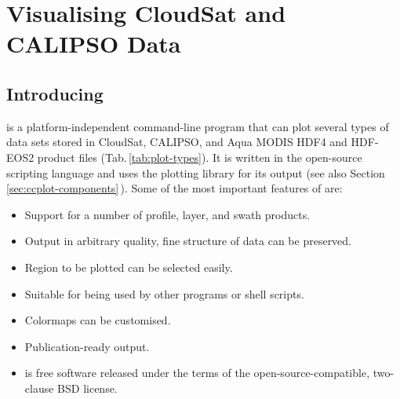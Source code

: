 \chapter{Visualising CloudSat and CALIPSO Data}\label{chap:ccplot}

\section{Introducing \ccplot}
\ccplot is a platform-independent command-line program that can plot several
types of data sets stored in CloudSat, CALIPSO, and Aqua MODIS HDF4 and HDF-EOS2
product files (Tab.\,\ref{tab:plot-types}). It is written in the open-source
scripting language
 and uses the
 plotting library for its output (see also
Section\,\ref{sec:ccplot-components}\,). Some of the most
important features of \ccplot are:

\begin{itemize}
\setlength{\itemsep}{0pt}
\setlength{\parskip}{0pt}
\setlength{\parsep}{0pt}
\item Support for a number of profile, layer, and swath products.
\item Output in arbitrary quality, fine structure of data can be preserved.
\item Region to be plotted can be selected easily.
\item Suitable for being used by other programs or shell scripts.
\item Colormaps can be customised.
\item Publication-ready output.
\item \ccplot is free software released under the terms of the
open-source-compatible, two-clause BSD license.
\end{itemize}

